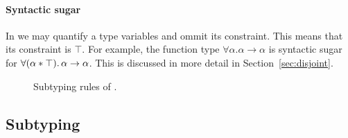 
\paragraph{Syntactic sugar}
In \name we may quantify a type variables and ommit its constraint. 
This means that its constraint is $\top$. 
For example, the function type $\forall \alpha. \alpha \to \alpha$ is syntactic sugar
for  $\forall (\alpha * \top).\, \alpha \to \alpha$.
This is discussed in more detail in Section~\ref{sec:disjoint}. 


\begin{figure}[!t]
\begin{spacing}{0.5}
\end{spacing}
  \caption{Subtyping rules of \name.}
  \label{fig:fi-subtype}
\end{figure}

\subsection{Subtyping}

